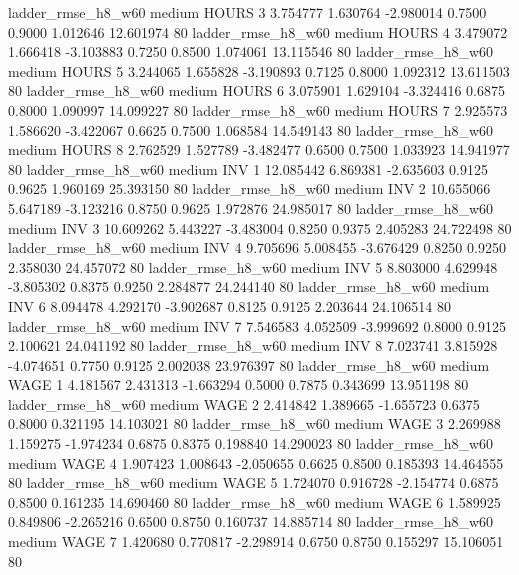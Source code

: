     ladder_rmse_h8_w60     medium    HOURS                 3  3.754777 1.630764 -2.980014 0.7500 0.9000  1.012646   12.601974 80
    ladder_rmse_h8_w60     medium    HOURS                 4  3.479072 1.666418 -3.103883 0.7250 0.8500  1.074061   13.115546 80
    ladder_rmse_h8_w60     medium    HOURS                 5  3.244065 1.655828 -3.190893 0.7125 0.8000  1.092312   13.611503 80
    ladder_rmse_h8_w60     medium    HOURS                 6  3.075901 1.629104 -3.324416 0.6875 0.8000  1.090997   14.099227 80
    ladder_rmse_h8_w60     medium    HOURS                 7  2.925573 1.586620 -3.422067 0.6625 0.7500  1.068584   14.549143 80
    ladder_rmse_h8_w60     medium    HOURS                 8  2.762529 1.527789 -3.482477 0.6500 0.7500  1.033923   14.941977 80
    ladder_rmse_h8_w60     medium      INV                 1 12.085442 6.869381 -2.635603 0.9125 0.9625  1.960169   25.393150 80
    ladder_rmse_h8_w60     medium      INV                 2 10.655066 5.647189 -3.123216 0.8750 0.9625  1.972876   24.985017 80
    ladder_rmse_h8_w60     medium      INV                 3 10.609262 5.443227 -3.483004 0.8250 0.9375  2.405283   24.722498 80
    ladder_rmse_h8_w60     medium      INV                 4  9.705696 5.008455 -3.676429 0.8250 0.9250  2.358030   24.457072 80
    ladder_rmse_h8_w60     medium      INV                 5  8.803000 4.629948 -3.805302 0.8375 0.9250  2.284877   24.244140 80
    ladder_rmse_h8_w60     medium      INV                 6  8.094478 4.292170 -3.902687 0.8125 0.9125  2.203644   24.106514 80
    ladder_rmse_h8_w60     medium      INV                 7  7.546583 4.052509 -3.999692 0.8000 0.9125  2.100621   24.041192 80
    ladder_rmse_h8_w60     medium      INV                 8  7.023741 3.815928 -4.074651 0.7750 0.9125  2.002038   23.976397 80
    ladder_rmse_h8_w60     medium     WAGE                 1  4.181567 2.431313 -1.663294 0.5000 0.7875  0.343699   13.951198 80
    ladder_rmse_h8_w60     medium     WAGE                 2  2.414842 1.389665 -1.655723 0.6375 0.8000  0.321195   14.103021 80
    ladder_rmse_h8_w60     medium     WAGE                 3  2.269988 1.159275 -1.974234 0.6875 0.8375  0.198840   14.290023 80
    ladder_rmse_h8_w60     medium     WAGE                 4  1.907423 1.008643 -2.050655 0.6625 0.8500  0.185393   14.464555 80
    ladder_rmse_h8_w60     medium     WAGE                 5  1.724070 0.916728 -2.154774 0.6875 0.8500  0.161235   14.690460 80
    ladder_rmse_h8_w60     medium     WAGE                 6  1.589925 0.849806 -2.265216 0.6500 0.8750  0.160737   14.885714 80
    ladder_rmse_h8_w60     medium     WAGE                 7  1.420680 0.770817 -2.298914 0.6750 0.8750  0.155297   15.106051 80
